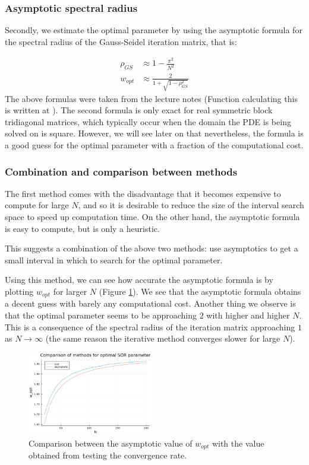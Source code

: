 \documentclass{article}
\numberwithin{equation}{section}
\theoremstyle{definition}
\begin{document}
\subsubsection{Asymptotic spectral radius}
Secondly, we estimate the optimal parameter by using the asymptotic formula for the spectral radius of the Gauss-Seidel iteration matrix, that is:

\begin{align}
    \rho_{GS} &\approx 1 - \frac{\pi^2}{N^2} \\
    w_{opt} &\approx \frac{2}{1 + \sqrt{1-\rho_{GS}^2}}
\end{align}
The above formulas were taken from the lecture notes (Function calculating this is written at ). The second formula is only exact for real symmetric block tridiagonal matrices, which typically occur when the domain the PDE is being solved on is square. However, we will see later on that nevertheless, the formula is a good guess for the optimal parameter with a fraction of the computational cost.

\subsubsection{Combination and comparison between methods}
The first method comes with the disadvantage that it becomes expensive to compute for large $N$, and so it is desirable to reduce the size of the interval search space to speed up computation time. On the other hand, the asymptotic formula is easy to compute, but is only a heuristic.

This suggests a combination of the above two methods: use asymptotics to get a small interval in which to search for the optimal parameter.

Using this method, we can see how accurate the asymptotic formula is by plotting $w_{opt}$ for larger $N$ (Figure \ref{fig:figsor2}). We see that the asymptotic formula obtains a decent guess with barely any computational cost. Another thing we observe is that the optimal parameter seems to be approaching $2$ with higher and higher $N$. This is a consequence of the spectral radius of the iteration matrix approaching $1$ as $N \to \infty$ (the same reason the iterative method converges slower for large $N$).

\begin{figure}[H]
    \centering
    \includegraphics[width=0.49\textwidth]{figsor2.png}
    \caption{Comparison between the asymptotic value of $w_{opt}$ with the value obtained from testing the convergence rate.}
    \label{fig:figsor2}
\end{figure}
\end{document}
